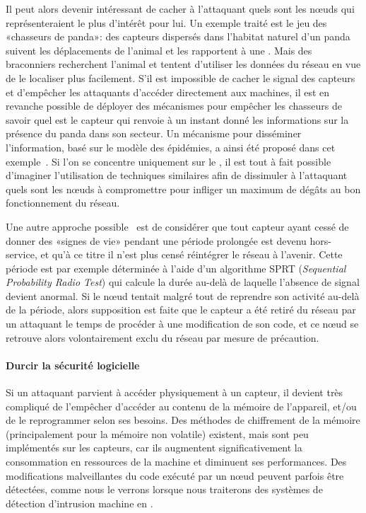 Il peut alors devenir intéressant de cacher à l'attaquant quels sont les nœuds qui représenteraient le plus d'intérêt pour lui.
Un exemple traité est le jeu des «chasseurs de panda»: des capteurs dispersés dans l'habitat naturel d'un panda suivent les déplacements de l'animal et les rapportent à une \sdb.
Mais des braconniers recherchent l'animal et tentent d'utiliser les données du réseau en vue de le localiser plus facilement.
S'il est impossible de cacher le signal des capteurs et d'empêcher les attaquants d'accéder directement aux machines, il est en revanche possible de déployer des mécanismes pour empêcher les chasseurs de savoir quel est le capteur qui renvoie à un instant donné les informations sur la présence du panda dans son secteur.
Un mécanisme pour disséminer l'information, basé sur le modèle des épidémies, a ainsi été proposé dans cet exemple~\cite{KDA14}.
Si l'on se concentre uniquement sur le \dds, il est tout à fait possible d'imaginer l'utilisation de techniques similaires afin de dissimuler à l'attaquant quels sont les nœuds à compromettre pour infliger un maximum de dégâts au bon fonctionnement du réseau.

Une autre approche possible~\cite{Ho10} est de considérer que tout capteur ayant cessé de donner des «signes de vie» pendant une période prolongée est devenu hors-service, et qu'à ce titre il n'est plus censé réintégrer le réseau à l'avenir.
Cette période est par exemple déterminée à l'aide d'un algorithme SPRT (\textit{Sequential Probability Radio Test}) qui calcule la durée au-delà de laquelle l'absence de signal devient anormal.
Si le nœud tentait malgré tout de reprendre son activité au-delà de la période, alors supposition est faite que le capteur a été retiré du réseau par un attaquant le temps de procéder à une modification de son code, et ce nœud se retrouve alors volontairement exclu du réseau par mesure de précaution.

\paragraph{Durcir la sécurité logicielle}
Si un attaquant parvient à accéder physiquement à un capteur, il devient très compliqué de l'empêcher d'accéder au contenu de la mémoire de l'appareil, et/ou de le reprogrammer selon ses besoins.
Des méthodes de chiffrement de la mémoire (principalement pour la mémoire non volatile) existent, mais sont peu implémentés sur les capteurs, car ils augmentent significativement la consommation en ressources de la machine et diminuent ses performances.
Des modifications malveillantes du code exécuté par un nœud peuvent parfois être détectées, comme nous le verrons lorsque nous traiterons des systèmes de détection d'intrusion machine en .

